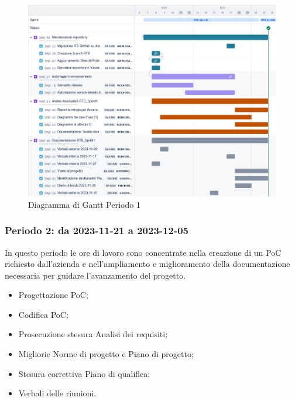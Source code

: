 \documentclass[10pt, a4paper]{article}
\begin{document}
{{{{{{{{\begin{itemize}
\end{itemize}
\vspace{1em}

 \begin{figure}[H]
        \centering        
        \includegraphics[width=15.5cm]{ganttPeriodo1.png}
        \caption{Diagramma di Gantt Periodo 1 }
    \end{figure}

\subsubsection{Periodo 2: da 2023-11-21 a 2023-12-05}
In questo periodo le ore di lavoro sono concentrate nella creazione di un PoC richiesto dall'azienda e nell'ampliamento e miglioramento della documentazione necessaria per guidare l'avanzamento del progetto.
\begin{itemize}
    \item Progettazione PoC;
    \item Codifica PoC;
    \item Prosecuzione stesura Analisi dei requisiti;
    \item Migliorie Norme di progetto e Piano di progetto;
    \item Stesura correttiva Piano di qualifica;
    \item Verbali delle riunioni.
  

\end{itemize}}}}}}}}}
\end{document}
